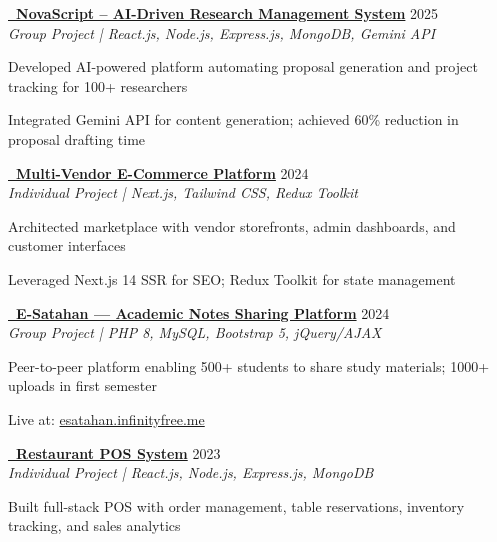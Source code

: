 \documentclass[letterpaper,10pt]{article}
\newenvironment{resume_list}{
  \vspace{-1pt}
  \begin{itemize}[itemsep=2pt, leftmargin=14pt]
}{
  \end{itemize}\vspace{-2pt}
}
\begin{document}
\vspace{3pt}
\href{https://github.com/Chandima0406/NovaScript.git}{\textbf{\faGithub~NovaScript – AI-Driven Research Management System}} \hfill 2025\\
\textit{Group Project | React.js, Node.js, Express.js, MongoDB, Gemini API}
\begin{resume_list}
  \item Developed AI-powered platform automating proposal generation and project tracking for 100+ researchers
  \item Integrated Gemini API for content generation; achieved 60\% reduction in proposal drafting time
\end{resume_list}

\vspace{3pt}
\href{https://github.com/vindyakodithuwakku02/gocart.git}{\textbf{\faGithub~Multi-Vendor E-Commerce Platform}} \hfill 2024\\
\textit{Individual Project | Next.js, Tailwind CSS, Redux Toolkit}
\begin{resume_list}
  \item Architected marketplace with vendor storefronts, admin dashboards, and customer interfaces
  \item Leveraged Next.js 14 SSR for SEO; Redux Toolkit for state management
\end{resume_list}

\vspace{3pt}
\href{https://github.com/Chandima0406/E-Satahan.git}{\textbf{\faGithub~E-Satahan — Academic Notes Sharing Platform}} \hfill 2024\\
\textit{Group Project | PHP 8, MySQL, Bootstrap 5, jQuery/AJAX}
\begin{resume_list}
  \item Peer-to-peer platform enabling 500+ students to share study materials; 1000+ uploads in first semester
  \item Live at: \href{https://esatahan.infinityfree.me}{esatahan.infinityfree.me}
\end{resume_list}

\vspace{3pt}
\href{https://github.com/vindyakodithuwakku02/pos-system.git}{\textbf{\faGithub~Restaurant POS System}} \hfill 2023\\
\textit{Individual Project | React.js, Node.js, Express.js, MongoDB}
\begin{resume_list}
  \item Built full-stack POS with order management, table reservations, inventory tracking, and sales analytics
\end{resume_list}
\end{document}
